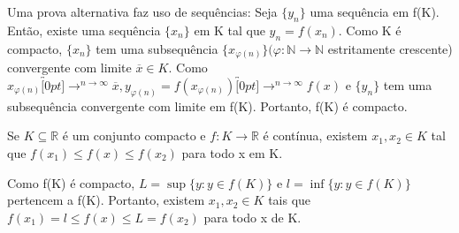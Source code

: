 \documentclass[Analysis/analysis_notes.tex]{subfiles}
\begin{document}
\begin{proof*}
	Uma prova alternativa faz uso de sequências: Seja $\{y_{n}\}$ uma sequência em f(K). Então, existe uma sequência
	$\{x_{n}\}$ em K tal que $y_{n}=f(x_{n}).$ Como K é compacto, $\{x_{n}\}$ tem uma subsequência $\{x_{\varphi (n)}\}(\varphi :\mathbb{N}\rightarrow \mathbb{N}$
	estritamente crescente) convergente com limite $\overline{x}\in K.$ Como $x_{\varphi (n)}\overbracket[0pt]{\longrightarrow}^{n\to \infty}\overline{x},
		y_{\varphi (n)}=f(x_{\varphi (n)})\overbracket[0pt]{\longrightarrow}^{n\to \infty}f(x)$ e $\{y_{n}\}$ tem uma
	subsequência convergente com limite em f(K). Portanto, f(K) é compacto. \qedsymbol
\end{proof*}
\begin{theorem*}
	Se $K\subseteq{\mathbb{R}}$ é um conjunto compacto e $f:K\rightarrow \mathbb{R}$ é contínua, existem $x_{1},x_{2}\in K$ tal que
	$f(x_{1})\leq f(x)\leq f(x_{2})$ para todo x em K.
\end{theorem*}
\begin{proof*}
	Como f(K) é compacto, $L=\sup{\{y:y\in f(K)\}}$ e $l=\inf{\{y:y\in f(K)\}}$ pertencem a f(K). Portanto, existem $x_{1},x_{2}\in K$
	tais que $f(x_{1})=l\leq f(x)\leq L = f(x_{2})$ para todo x de K. \qedsymbol
\end{proof*}
\end{document}
